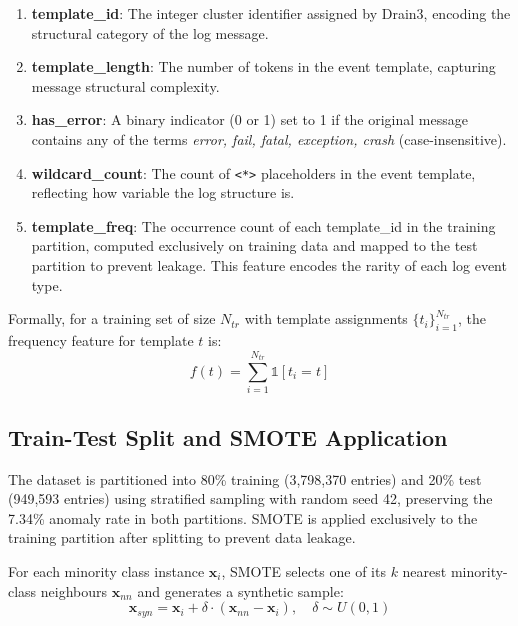 \documentclass[conference]{IEEEtran}
\begin{document}
\begin{enumerate}
  \item \textbf{template\_id}: The integer cluster identifier assigned by
        Drain3, encoding the structural category of the log message.
  \item \textbf{template\_length}: The number of tokens in the event
        template, capturing message structural complexity.
  \item \textbf{has\_error}: A binary indicator (0 or 1) set to 1 if the
        original message contains any of the terms \textit{error, fail,
        fatal, exception, crash} (case-insensitive).
  \item \textbf{wildcard\_count}: The count of \texttt{<*>} placeholders in
        the event template, reflecting how variable the log structure is.
  \item \textbf{template\_freq}: The occurrence count of each template\_id
        in the training partition, computed exclusively on training data and
        mapped to the test partition to prevent leakage. This feature
        encodes the rarity of each log event type.
\end{enumerate}

Formally, for a training set of size $N_{tr}$ with template assignments
$\{t_i\}_{i=1}^{N_{tr}}$, the frequency feature for template $t$ is:
\begin{equation}
  f(t) = \sum_{i=1}^{N_{tr}} \mathbb{1}[t_i = t]
  \label{eq:freq}
\end{equation}

\subsection{Train-Test Split and SMOTE Application}

The dataset is partitioned into 80\% training (3{,}798{,}370 entries) and
20\% test (949{,}593 entries) using stratified sampling with random seed
42, preserving the 7.34\% anomaly rate in both partitions. SMOTE
\cite{chawla2002} is applied exclusively to the training partition after
splitting to prevent data leakage.

For each minority class instance $\mathbf{x}_i$, SMOTE selects one of its
$k$ nearest minority-class neighbours $\mathbf{x}_{nn}$ and generates a
synthetic sample:
\begin{equation}
  \mathbf{x}_{syn} = \mathbf{x}_i + \delta \cdot
                     (\mathbf{x}_{nn} - \mathbf{x}_i),
  \quad \delta \sim U(0, 1)
  \label{eq:smote}
\end{equation}
\end{document}
